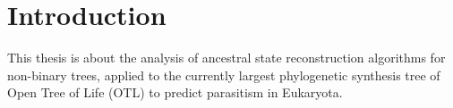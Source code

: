 
\tableofcontents
\clearpage
{}

\chapter{Introduction}
  This thesis is about the analysis of ancestral state reconstruction algorithms for non-binary 
    trees, applied to the currently largest phylogenetic synthesis tree of Open Tree of Life (OTL)
    \cite{Hinchliff2015} to predict parasitism in Eukaryota.

